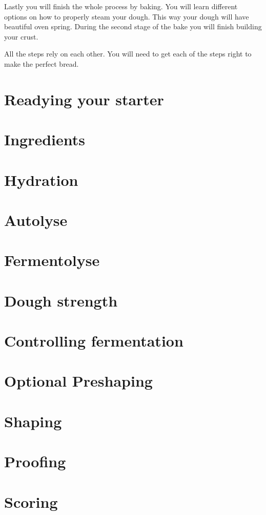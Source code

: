 Lastly you will finish the whole process by baking. You will learn different
options on how to properly steam your dough. This way your
dough will have beautiful oven spring. During the second
stage of the bake you will finish building your crust.

All the steps rely on each other. You will need to get each of
the steps right to make the perfect bread.

\section{Readying your starter}
\section{Ingredients}
\section{Hydration}
\section{Autolyse}
\section{Fermentolyse}
\section{Dough strength}
\section{Controlling fermentation}
\section{Optional Preshaping}
\section{Shaping}
\section{Proofing}
\section{Scoring}
